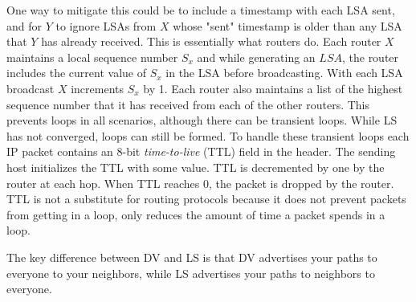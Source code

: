 One way to mitigate this could be to include a timestamp with each LSA
sent, and for $Y$ to ignore LSAs from $X$ whose "sent" timestamp is older than
any LSA that $Y$ has already received. This is essentially what routers do.
Each router $X$ maintains a local sequence number $S_x$ and while generating
an $LSA$, the router includes the current value of $S_x$ in the LSA before
broadcasting. With each LSA broadcast $X$ increments $S_x$ by 1. Each
router also maintains a list of the highest sequence number that it has
received from each of the other routers. This prevents loops in all scenarios,
although there can be transient loops. While LS has not converged, loops
can still be formed. To handle these transient loops each IP packet contains
an 8-bit \emph{time-to-live} (TTL) field in the header. The sending host
initializes the TTL with some value. TTL is decremented by one by the
router at each hop. When TTL reaches 0, the packet is dropped by the
router. TTL is not a substitute for routing protocols because it does not
prevent packets from getting in a loop, only reduces the amount of time
a packet spends in a loop.

The key difference between DV and LS is that DV advertises your paths to
everyone to your neighbors, while LS advertises your paths to neighbors
to everyone.